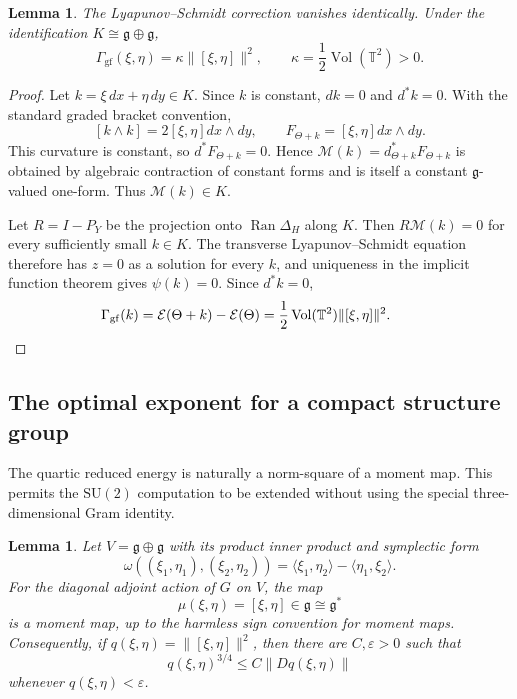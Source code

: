 \documentclass[11pt]{article}
\newtheorem{lemma}[theorem]{Lemma}
\theoremstyle{definition}
\theoremstyle{remark}
\begin{document}
\begin{lemma}\label{lem:reduction}
The Lyapunov--Schmidt correction vanishes identically. Under the identification $K\cong\mathfrak g\oplus\mathfrak g$,
$$
\Gamma_{\mathrm{gf}}(\xi,\eta)=\kappa\|[\xi,\eta]\|^2,
\qquad
\kappa=\frac12\operatorname{Vol}(\mathbb T^2)>0.
$$
\end{lemma}

\begin{proof}
Let $k=\xi\,dx+\eta\,dy\in K$. Since $k$ is constant, $dk=0$ and $d^*k=0$. With the standard graded bracket convention,
$$
[k\wedge k]=2[\xi,\eta]dx\wedge dy,
\qquad
F_{\Theta+k}=[\xi,\eta]dx\wedge dy.
$$
This curvature is constant, so $d^*F_{\Theta+k}=0$. Hence $\mathcal M(k)=d_{\Theta+k}^*F_{\Theta+k}$ is obtained by algebraic contraction of constant forms and is itself a constant $\mathfrak g$-valued one-form. Thus $\mathcal M(k)\in K$.

Let $R=I-P_Y$ be the projection onto $\operatorname{Ran}\Delta_H$ along $K$. Then $R\mathcal M(k)=0$ for every sufficiently small $k\in K$. The transverse Lyapunov--Schmidt equation therefore has $z=0$ as a solution for every $k$, and uniqueness in the implicit function theorem gives $\psi(k)=0$. Since $d^*k=0$,
$$
\Gamma_{\mathrm{gf}}(k)
=\mathcal E(\Theta+k)-\mathcal E(\Theta)
=\frac12\operatorname{Vol}(\mathbb T^2)\|[\xi,\eta]\|^2.  \qquad \qedhere
$$
\end{proof}

\subsection{The optimal exponent for a compact structure group}

The quartic reduced energy is naturally a norm-square of a moment map. This permits the $\mathrm{SU}(2)$ computation to be extended without using the special three-dimensional Gram identity.

\begin{lemma}\label{lem:YM-moment-map}
Let $V=\mathfrak g\oplus\mathfrak g$ with its product inner product and symplectic form
$$
\omega((\xi_1,\eta_1),(\xi_2,\eta_2))
=\langle\xi_1,\eta_2\rangle-\langle\eta_1,\xi_2\rangle.
$$
For the diagonal adjoint action of $G$ on $V$, the map
$$
\mu(\xi,\eta)=[\xi,\eta]\in\mathfrak g\cong\mathfrak g^*
$$
is a moment map, up to the harmless sign convention for moment maps. Consequently, if $q(\xi,\eta)=\|[\xi,\eta]\|^2$, then there are $C,\varepsilon>0$ such that
$$
q(\xi,\eta)^{3/4}\le C\|Dq(\xi,\eta)\|
$$
whenever $q(\xi,\eta)<\varepsilon$.
\end{lemma}
\end{document}

